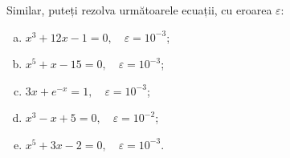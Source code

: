 \documentclass[11pt,a4paper]{article}
\theoremstyle{dotless}
\theoremstyle{dotlessdr}
\begin{document}
\vspace{1cm}

Similar, puteți rezolva următoarele ecuații, cu eroarea $\varepsilon$:
\begin{enumerate}[(a)]
\item $x^3 + 12x - 1 = 0, \quad \varepsilon = 10^{-3}$;
\item $x^5 + x - 15 = 0, \quad \varepsilon = 10^{-3}$;
\item $3x + e^{-x} = 1, \quad \varepsilon = 10^{-3}$;
\item $x^3 - x + 5 = 0, \quad \varepsilon = 10^{-2}$;
\item $x^5 + 3x - 2 = 0, \quad \varepsilon = 10^{-3}$.
\end{enumerate}
\end{document}
